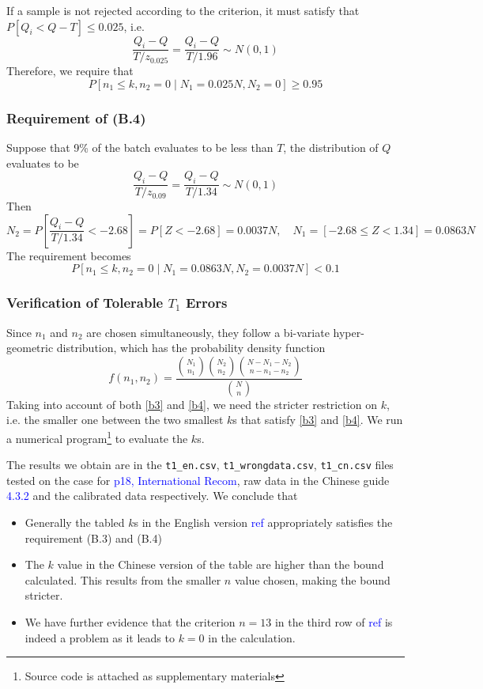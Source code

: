 \documentclass{article}
\def\unf#1{\textcolor{blue}{#1}}
\begin{document}
If a sample is not rejected according to the criterion, it must satisfy that $P[Q_i < Q - T] \leq 0.025$, i.e. 
$$
\dfrac{Q_i - Q}{T/z_{0.025}} = \dfrac{Q_i - Q}{T/1.96}\sim N(0,1)
$$
Therefore, we require that
\begin{equation}\label{b3}
    P[n_1\leq k, n_2 = 0\mid N_1 = 0.025N, N_2 = 0] \geq 0.95
\end{equation}

\subsubsection{Requirement of (B.4)}

Suppose that 9\% of the batch evaluates to be less than $T$, the distribution of $Q$ evaluates to be
$$
\dfrac{Q_i - Q}{T/z_{0.09}} = \dfrac{Q_i - Q}{T/1.34}\sim N(0,1)
$$
Then 
$$
N_2 = P[\dfrac{Q_i - Q}{T/1.34} < -2.68] = P[Z < -2.68] = 0.0037N, \quad N_1 = [-2.68\leq Z < 1.34] = 0.0863N
$$
The requirement becomes
\begin{equation}\label{b4}
    P[n_1\leq k, n_2 = 0\mid N_1 = 0.0863N, N_2 = 0.0037N] < 0.1
\end{equation}

\subsubsection{Verification of Tolerable $T_1$ Errors}

Since $n_1$ and $n_2$ are chosen simultaneously, they follow a bi-variate hyper-geometric distribution, which has the probability density function
$$
f(n_1, n_2) = \dfrac{\binom{N_1}{n_1}\binom{N_2}{n_2}\binom{N-N_1-N_2}{n-n_1-n_2}}{\binom{N}{n}}
$$
Taking into account of both \ref{b3} and \ref{b4}, we need the stricter restriction on $k$, i.e. the smaller one between the two smallest $k$s that satisfy \ref{b3} and \ref{b4}. We run a numerical program\footnote{Source code is attached as supplementary materials} to evaluate the $k$s. 

The results we obtain are in the \texttt{t1\_en.csv}, \texttt{t1\_wrongdata.csv}, \texttt{t1\_cn.csv} files tested on the case for \unf{p18, International Recom}, raw data in the Chinese guide \unf{4.3.2} and the calibrated data respectively. We conclude that 

\begin{itemize}
    \item Generally the tabled $k$s in the English version \unf{ref} appropriately satisfies the requirement (B.3) and (B.4) 
    \item The $k$ value in the Chinese version of the table are higher than the bound calculated. This results from the smaller $n$ value chosen, making the bound stricter.
    \item We have further evidence that the criterion $n=13$ in the third row of \unf{ref} is indeed a problem as it leads to $k = 0$ in the calculation.
\end{itemize}
\end{document}
